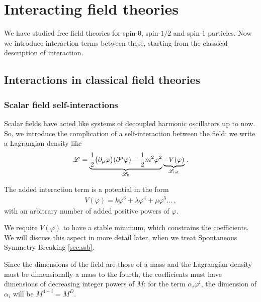 \documentclass[main.tex]{subfiles}
\begin{document}
\chapter{Interacting field theories}

We have studied free field theories for spin-0, spin-\(1/2\) and spin-1 particles. Now we introduce interaction terms between these, starting from the classical description of interaction. 

\section{Interactions in classical field theories}


\subsection{Scalar field self-interactions}

Scalar fields have acted like systems of decoupled harmonic oscillators up to now. So, we introduce the complication of a self-interaction between the field: we write a Lagrangian density like 
%
\begin{align}
\mathscr{L} = \underbrace{\frac{1}{2} \qty(\partial_{\mu }\varphi ) \qty(\partial^{\mu} \varphi ) - \frac{1}{2} m^2 \varphi^2}_{\mathscr{L}_{0}} \underbrace{- V(\varphi )}_{\mathscr{L} _{\text{int}}}
\,.
\end{align}

The added interaction term is a potential in the form 
%
\begin{align}
V(\varphi ) = k \varphi^3 + \lambda \varphi^{4} + \mu \varphi^{5} \dots
\,,
\end{align}
%
with an arbitrary number of added positive powers of \(\varphi \). 

We require \(V(\varphi )\) to have a stable minimum, which constrains the coefficients. 
We will discuss this aspect in more detail later, when we treat Spontaneous Symmetry Breaking \ref{sec:ssb}. 

Since the dimensions of the field are those of a mass and the Lagrangian density must be dimensionally a mass to the fourth, the coefficients must have dimensions of decreasing integer powers of \(M\): for the term \(\alpha_{i} \varphi^{i}\), the dimension of \(\alpha_{i}\) will be \(M^{4-i} = M^{D}\). 
\end{document}

